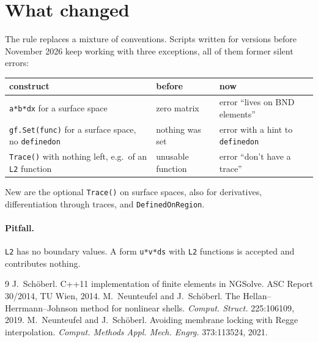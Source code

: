 \documentclass[10pt,a4paper]{article}
\newcommand{\code}[1]{\texttt{#1}}
\begin{document}
\section{What changed}

The rule replaces a mixture of conventions. Scripts written for versions before November 2026 keep working with three exceptions, all of them former silent errors:
\begin{center}\small
\begin{tabular}{@{}lll@{}}\toprule
construct & before & now \\\midrule
\code{a*b*dx} for a surface space & zero matrix & error ``lives on BND elements'' \\
\code{gf.Set(func)} for a surface space, no \code{definedon} & nothing was set & error with a hint to \code{definedon} \\
\code{Trace()} with nothing left, e.g.\ of an \code{L2} function & unusable function & error ``don't have a trace'' \\\bottomrule
\end{tabular}
\end{center}
New are the optional \code{Trace()} on surface spaces, also for derivatives, differentiation through traces, and \code{DefinedOnRegion}.

\paragraph{Pitfall.} \code{L2} has no boundary values. A form \code{u*v*ds} with \code{L2} functions is accepted and contributes nothing.

\begin{thebibliography}{9}\small\setlength\itemsep{1pt}
 J.~Sch\"oberl. C++11 implementation of finite elements in NGSolve. ASC Report 30/2014, TU Wien, 2014.
 M.~Neunteufel and J.~Sch\"oberl. The Hellan--Herrmann--Johnson method for nonlinear shells. \emph{Comput. Struct.} 225:106109, 2019.
 M.~Neunteufel and J.~Sch\"oberl. Avoiding membrane locking with Regge interpolation. \emph{Comput. Methods Appl. Mech. Engrg.} 373:113524, 2021.
\end{thebibliography}
\end{document}
